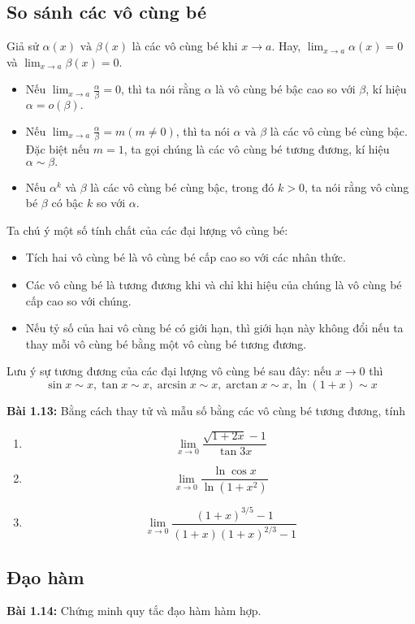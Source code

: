\subsection*{So sánh các vô cùng bé}
 Giả sử \(\alpha(x)\text{ và }\beta(x)\) là các vô cùng bé khi $x\rightarrow a$. Hay, \(\lim_{x\rightarrow a}\alpha(x)=0\) và \(\lim_{x\rightarrow a}\beta(x)=0\).
\begin{itemize}
    \item Nếu \(\lim_{x\rightarrow a}\frac{\alpha}{\beta}=0\), thì ta nói rằng $\alpha$ là vô cùng bé bậc cao so với $\beta$, kí hiệu $\alpha=o(\beta).$ 
    \item Nếu \(\lim_{x\rightarrow a}\frac{\alpha}{\beta}=m ( m\neq 0)\), thì ta nói \(\alpha\text{ và }\beta\) là các vô cùng bé cùng bậc. Đặc biệt nếu \(m=1\), ta gọi chúng là các vô cùng bé tương đương, kí hiệu $\alpha\sim \beta.$
    \item Nếu \(\alpha^k\) và \(\beta\) là các vô cùng bé cùng bậc, trong đó \(k>0\), ta nói rằng vô cùng bé \(\beta\) có bậc \(k\) so với \(\alpha\).
\end{itemize}
Ta chú ý một số tính chất của các đại lượng vô cùng bé:
\begin{itemize}
    \item Tích hai vô cùng bé là vô cùng bé cấp cao so với các nhân thức.
    \item Các vô cùng bé là tương đương khi và chỉ khi hiệu của chúng là vô cùng bé cấp cao so với chúng.
    \item Nếu tỷ số của hai vô cùng bé có giới hạn, thì giới hạn này không đổi nếu ta thay mỗi vô cùng bé bằng một vô cùng bé tương đương.
\end{itemize}
Lưu ý sự tương đương của các đại lượng vô cùng bé sau đây: nếu \(x\rightarrow 0\) thì \[\sin x\sim x, \tan x\sim x, \arcsin x\sim x, \arctan x\sim x, \ln(1+x)\sim x\]

\textbf{Bài 1.13:} 
Bằng cách thay tử và mẫu số bằng các vô cùng bé tương đương, tính 
\begin{enumerate}[label=(\alph*)]
    \item \[\lim_{x\rightarrow 0}\frac{\sqrt{1+2x}-1}{\tan 3x}\]
    \item \[\lim_{x\rightarrow 0}\frac{\ln \cos x}{\ln (1+x^2)}\]
    \item \[\lim_{x\rightarrow 0}\frac{(1+x)^{3/5}-1}{(1+x)(1+x)^{2/3}-1}\]
\end{enumerate}

\subsection*{Đạo hàm}
\textbf{Bài 1.14:} Chứng minh quy tắc đạo hàm hàm hợp.
\vspace{5pt}

